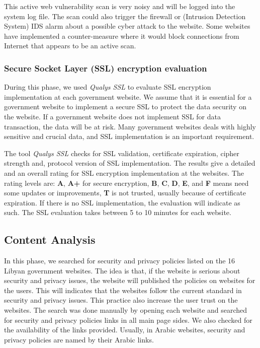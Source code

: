 \documentclass[conference,letterpaper]{IEEEtran}
\begin{document}
This active web vulnerability scan is very noisy and will be logged
into the system log file. The scan could also trigger the firewall or
(Intrusion Detection System) IDS alarm about a possible cyber attack
to the website. Some websites have implemented a counter-measure where
it would block connections from Internet that appears to be an active
scan\cite{stuttard2011web}.

\subsubsection{Secure Socket Layer (SSL) encryption evaluation}


During this phase, we used \emph{Qualys SSL} to evaluate SSL
encryption implementation at each government website. We assume that
it is essential for a government website to implement a secure SSL to
protect the data security on the website. If a government website does
not implement SSL for data transaction, the data will be at risk. Many
government websites deals with highly sensitive and crucial data, and
SSL implementation is an important requirement.

The tool \emph{Qualys SSL} checks for SSL validation, certificate
expiration, cipher strength and, protocol version of SSL
implementation. The results give a detailed and an overall rating for
SSL encryption implementation at the websites. The rating levels are:
\textbf{A}, \textbf{A+} for secure encryption, \textbf{B}, \textbf{C},
\textbf{D}, \textbf{E}, and \textbf{F} means need some updates or
improvements, \textbf{T} is not trusted, usually because of
certificate expiration. If there is no SSL implementation, the
evaluation will indicate as such.  The SSL evaluation takes between 5
to 10 minutes for each website.

\subsection{Content Analysis}

In this phase, we searched for security and privacy policies listed on
the 16 Libyan government websites. The idea is that, if the website is
serious about security and privacy issues, the website will published
the policies on websites for the users. This will indicates that the
websites follow the current standard in security and privacy
issues. This practice also increase the user trust on the
websites. The search was done manually by opening each
website and searched for security and privacy policies links in all
main page sides. We also checked for the availability of the
links provided. Usually, in Arabic websites, security and privacy policies are
named by their Arabic links.
\end{document}
